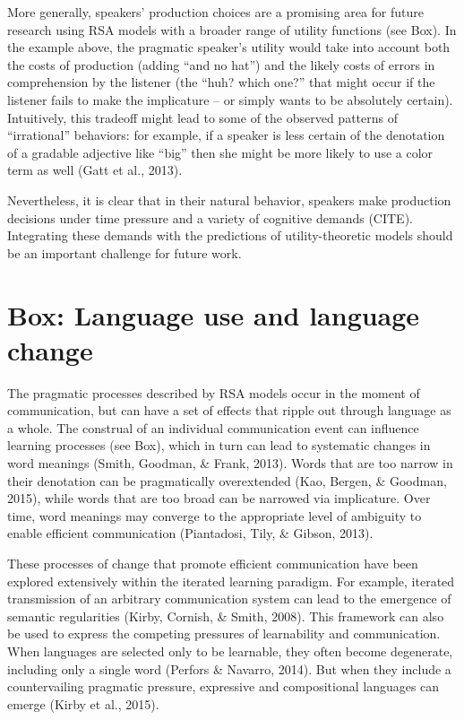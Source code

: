\documentclass[]{elsarticle}
\begin{document}
More generally, speakers' production choices are a promising area for
future research using RSA models with a broader range of utility
functions (see Box). In the example above, the pragmatic speaker's
utility would take into account both the costs of production (adding
``and no hat'') and the likely costs of errors in comprehension by the
listener (the ``huh? which one?'' that might occur if the listener fails
to make the implicature -- or simply wants to be absolutely certain).
Intuitively, this tradeoff might lead to some of the observed patterns
of ``irrational'' behaviors: for example, if a speaker is less certain
of the denotation of a gradable adjective like ``big'' then she might be
more likely to use a color term as well (Gatt et al., 2013).

Nevertheless, it is clear that in their natural behavior, speakers make
production decisions under time pressure and a variety of cognitive
demands (CITE). Integrating these demands with the predictions of
utility-theoretic models should be an important challenge for future
work.

\section{Box: Language use and language
change}\label{box-language-use-and-language-change}

The pragmatic processes described by RSA models occur in the moment of
communication, but can have a set of effects that ripple out through
language as a whole. The construal of an individual communication event
can influence learning processes (see Box), which in turn can lead to
systematic changes in word meanings (Smith, Goodman, \& Frank, 2013).
Words that are too narrow in their denotation can be pragmatically
overextended (Kao, Bergen, \& Goodman, 2015), while words that are too
broad can be narrowed via implicature. Over time, word meanings may
converge to the appropriate level of ambiguity to enable efficient
communication (Piantadosi, Tily, \& Gibson, 2013).

These processes of change that promote efficient communication have been
explored extensively within the iterated learning paradigm. For example,
iterated transmission of an arbitrary communication system can lead to
the emergence of semantic regularities (Kirby, Cornish, \& Smith, 2008).
This framework can also be used to express the competing pressures of
learnability and communication. When languages are selected only to be
learnable, they often become degenerate, including only a single word
(Perfors \& Navarro, 2014). But when they include a countervailing
pragmatic pressure, expressive and compositional languages can emerge
(Kirby et al., 2015).
\end{document}
